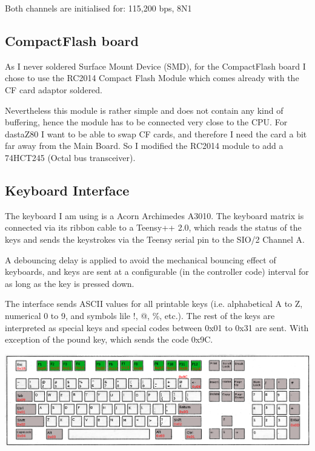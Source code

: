 \documentclass[a4paper,11pt]{article}
\begin{document}
    Both channels are initialised for: 115,200 bps, 8N1

    \subsection{CompactFlash board}

    As I never soldered Surface Mount Device (SMD), for the CompactFlash board
    I chose to use the RC2014 Compact Flash Module which comes already with the
    CF card adaptor soldered.

    Nevertheless this module is rather simple and does not contain any kind of
    buffering, hence the module has to be connected very close to the CPU. For
    dastaZ80 I want to be able to swap CF cards, and therefore I need the card
    a bit far away from the Main Board. So I modified the RC2014 module to add
    a 74HCT245 (Octal bus transceiver).

    \subsection{Keyboard Interface}

    The keyboard I am using is a Acorn Archimedes A3010. The keyboard matrix is
    connected via its ribbon cable to a Teensy++ 2.0, which reads the status of
    the keys and sends the keystrokes via the Teensy serial pin to the SIO/2
    Channel A.

    A debouncing delay is applied to avoid the mechanical bouncing effect of
    keyboards, and keys are sent at a configurable (in the controller code)
    interval for as long as the key is pressed down.

    The interface sends ASCII values for all printable keys (i.e. alphabetical
    A to Z, numerical 0 to 9, and symbols lile !, @, \%, etc.). The rest of the
    keys are interpreted as special keys and special codes between 0x01 to 0x31
    are sent. With exception of the pound key, which sends the code 0x9C.

    \begin{center}
        \includegraphics[scale=0.3]{a3010_kbd_layout.png}
    \end{center}
\end{document}
